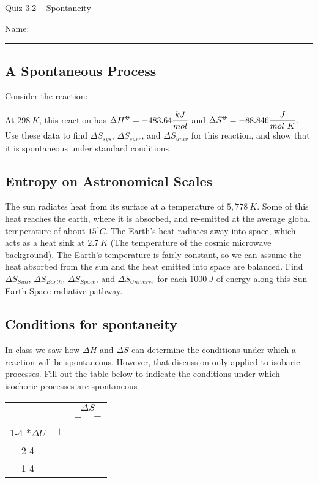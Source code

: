 \documentclass[11pt, letterpaper]{memoir}
\begin{document}
	\begin{center}
		{\large Quiz 3.2 -- Spontaneity}
	\end{center}
	{\large Name: \rule[-1mm]{4in}{.1pt} 

\subsection*{A Spontaneous Process}

Consider the reaction: 

\noindent
At $298~K$, this reaction has $\Delta H^{\std} = -483.64\dfrac{kJ}{mol}$ and $\Delta S^{\std}= -88.846\dfrac{J}{mol~K}$. Use these data to find $\Delta S_{sys}$, $\Delta S_{surr}$, and $\Delta S_{univ}$ for this reaction, and show that it is spontaneous under standard conditions

\vspace{4em}
\subsection*{Entropy on Astronomical Scales}
The sun radiates heat from its surface at a temperature of $5,778~K$. Some of this heat reaches the earth, where it is absorbed, and re-emitted at the average global temperature of about $15 ^\circ C$. The Earth's heat radiates away into space, which acts as a heat sink at $2.7~K$ (The temperature of the cosmic microwave background). The Earth's temperature is fairly constant, so we can assume the heat absorbed from the sun and the heat emitted into space are balanced. Find $\Delta S_{Sun}$, $\Delta S_{Earth}$, $\Delta S_{Space}$, and $\Delta S_{Universe}$ for each $1000~J$ of energy along this Sun-Earth-Space radiative pathway.


\vspace{10em}
\subsection*{Conditions for spontaneity}
In class we saw how $\Delta H$ and $\Delta S$ can determine the conditions under which a reaction will be spontaneous. However, that discussion only applied to isobaric processes. Fill out the table below to indicate the conditions under which isochoric processes are spontaneous

\begin{center}
	\begin{tabular}{cc|c|c|}
		&&\multicolumn{2}{c|}{$\Delta S$} \\
		&& $+$ & $-$ \\ \cline{1-4}
		\multirow{2}*{$\Delta U$} &$+$&~\hspace{12em}~& ~\hspace{12em}~\\  \cline{2-4}
		&$-$&& \\ \cline{1-4}
		

\end{tabular}
\end{center}}
\end{document}
